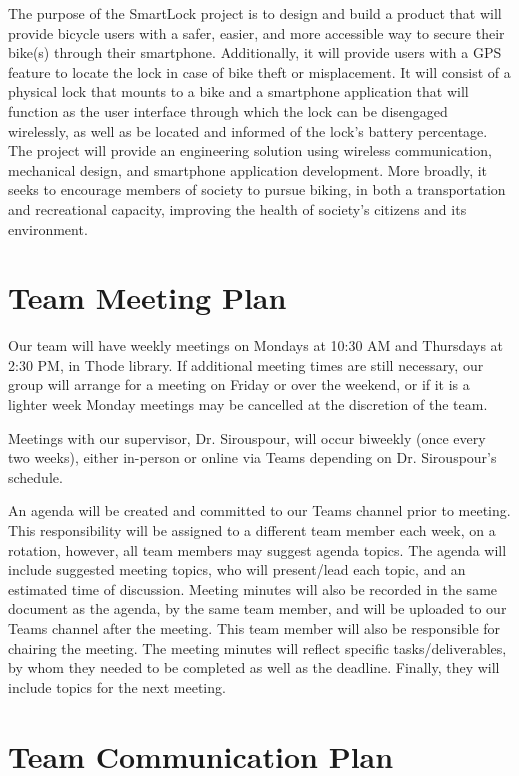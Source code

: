 \documentclass{article}
\begin{document}
The purpose of the SmartLock project is to design and build a product that will provide bicycle users with a safer, easier, and more accessible way to secure their bike(s) through their smartphone. Additionally, it will provide users with a GPS feature to locate the lock in case of bike theft or misplacement.  It will consist of a physical lock that mounts to a bike and a smartphone application that will function as the user interface through which the lock can be disengaged wirelessly, as well as be located and informed of the lock's battery percentage. The project will provide an engineering solution using wireless communication, mechanical design, and smartphone application development. More broadly, it seeks to encourage members of society to pursue biking, in both a transportation and recreational capacity, improving the health of society’s citizens and its environment.  

\section{Team Meeting Plan}

Our team will have weekly meetings on Mondays at 10:30 AM and Thursdays at 2:30 PM, in Thode library. If additional meeting times are still necessary, our group will arrange for a meeting on Friday or over the weekend, or if it is a lighter week Monday meetings may be cancelled at the discretion of the team.

Meetings with our supervisor, Dr. Sirouspour, will occur biweekly (once every two weeks), either in-person or online via Teams depending on Dr. Sirouspour's schedule.

An agenda will be created and committed to our Teams channel prior to meeting.  This responsibility will be assigned to a different team member each week, on a rotation, however, all team members may suggest agenda topics.  The agenda will include suggested meeting topics, who will present/lead each topic, and an estimated time of discussion. Meeting minutes will also be recorded in the same document as the agenda, by the same team member, and will be uploaded to our Teams channel after the meeting.  This team member will also be responsible for chairing the meeting. The meeting minutes will reflect specific tasks/deliverables, by whom they needed to be completed as well as the deadline. Finally, they will include topics for the next meeting.

\section{Team Communication Plan}
\end{document}
